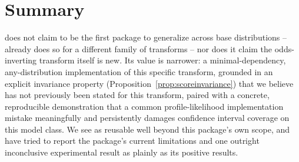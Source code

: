 \documentclass[article]{jss}
\begin{document}
\section{Summary}
\label{sec:discussion}

 does not claim to be the first package to generalize across base distributions --  already does so for a different family of transforms -- nor does it claim the odds-inverting transform itself is new. Its value is narrower: a minimal-dependency, any-distribution implementation of this specific transform, grounded in an explicit invariance property (Proposition~\ref{prop:scoreinvariance}) that we believe has not previously been stated for this transform, paired with a concrete, reproducible demonstration that a common profile-likelihood implementation mistake meaningfully and persistently damages confidence interval coverage on this model class. We see  as reusable well beyond this package's own scope, and have tried to report the package's current limitations and one outright inconclusive experimental result as plainly as its positive results.


\end{document}
